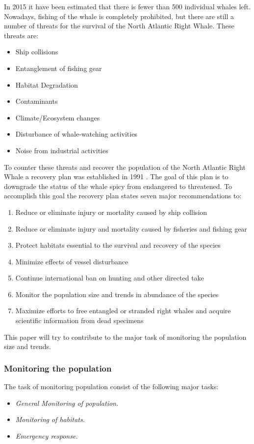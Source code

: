 In 2015 it have been estimated that there is fewer than 500 individual whales left. Nowadays, fishing of the whale is completely prohibited, but there are still a number of threats for the survival of the North Atlantic Right Whale.
These threats are:
\begin{itemize}
\item Ship collisions 
\item Entanglement of fishing gear
\item Habitat Degradation 
\item Contaminants
\item Climate/Ecosystem changes
\item Disturbance of whale-watching activities
\item Noise from industrial activities
\end{itemize}
To counter these threats and recover the population of the North Atlantic Right Whale a recovery plan was established in 1991 \cite{NOAARecovery} . The goal of this plan is to downgrade the status of the whale spicy from endangered to threatened.
To accomplish this goal the recovery plan states seven major recommendations to:
\begin{enumerate}
\item Reduce or eliminate injury or mortality caused by ship collision
\item Reduce or eliminate injury and mortality caused by fisheries and fishing gear
\item Protect habitats essential to the survival and recovery of the species
\item Minimize effects of vessel disturbance
\item Continue international ban on hunting and other directed take
\item Monitor the population size and trends in abundance of the species
\item Maximize efforts to free entangled or stranded right whales and acquire scientific information from dead specimens
\end{enumerate} 
This paper will try to contribute to the major task of monitoring the population size and trends. 



\subsubsection{Monitoring the population}


The task of monitoring population consist of the following major tasks:
\begin{itemize}
\item \textit{General Monitoring of population.}
\item \textit{Monitoring of habitats.}
\item \textit{Emergency response.}
\end{itemize}

